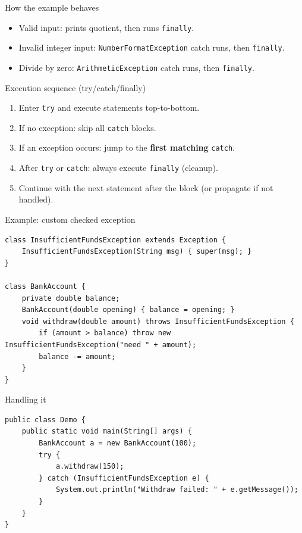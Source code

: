 \documentclass{beamer}
\begin{document}
\begin{frame}{How the example behaves}
  \begin{itemize}[<+->]
    \item Valid input: prints quotient, then runs \texttt{finally}.
    \item Invalid integer input: \texttt{NumberFormatException} catch runs, then \texttt{finally}.
    \item Divide by zero: \texttt{ArithmeticException} catch runs, then \texttt{finally}.
  \end{itemize}
  \slidesources{\OOPSUnitIIISources}
\end{frame}

\begin{frame}{Execution sequence (try/catch/finally)}
  \begin{enumerate}[<+->]
    \item Enter \texttt{try} and execute statements top-to-bottom.
    \item If no exception: skip all \texttt{catch} blocks.
    \item If an exception occurs: jump to the \textbf{first matching} \texttt{catch}.
    \item After \texttt{try} or \texttt{catch}: always execute \texttt{finally} (cleanup).
    \item Continue with the next statement after the block (or propagate if not handled).
  \end{enumerate}
  \slidesources{\OOPSUnitIIISources}
\end{frame}

\begin{frame}[fragile,shrink=8]{Example: custom checked exception}
\begin{lstlisting}
class InsufficientFundsException extends Exception {
    InsufficientFundsException(String msg) { super(msg); }
}

class BankAccount {
    private double balance;
    BankAccount(double opening) { balance = opening; }
    void withdraw(double amount) throws InsufficientFundsException {
        if (amount > balance) throw new InsufficientFundsException("need " + amount);
        balance -= amount;
    }
}
\end{lstlisting}
  \slidesources{\OOPSUnitIIISources}
\end{frame}

\begin{frame}[fragile]{Handling it}
\begin{lstlisting}
public class Demo {
    public static void main(String[] args) {
        BankAccount a = new BankAccount(100);
        try {
            a.withdraw(150);
        } catch (InsufficientFundsException e) {
            System.out.println("Withdraw failed: " + e.getMessage());
        }
    }
}
\end{lstlisting}
  \slidesources{\OOPSUnitIIISources}
\end{frame}
\end{document}
